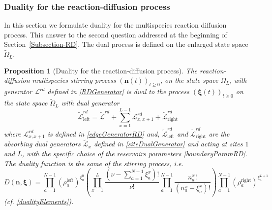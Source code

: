 \documentclass[10pt]{article}
\numberwithin{equation}{section}
\numberwithin{equation}{subsection}
\newtheorem{proposition}{Proposition}
\begin{document}
\subsubsection{Duality for the reaction-diffusion process}
In this section we formulate duality for the multispecies reaction diffusion process. This answer to the second question addressed at the beginning of Section~\ref{Subsection-RD}.  The dual process is defined on the enlarged state space $\widetilde{\Omega}_{L}$.  
\begin{proposition}[Duality for the reaction-diffusion process]\label{propositin-duality-RD}
The reaction-diffusion multispecies stirring process $(\bm{n}(t))_{t\geq 0}$, on the state space $\Omega_{L}$, with generator $\mathcal{L}^{rd}$ defined in \eqref{RDGenerator} is dual to the process $(\bm{\xi}(t))_{t\geq 0}$ on the state space $\widetilde{\Omega}_{L}$ with dual generator
\begin{equation}\label{DualGeneratorRD}
	\widetilde{\mathcal{L}}_{\text{left}}^{rd}=\widetilde{\mathcal{L}}^{rd}+\sum_{x=1}^{L-1}\mathcal{L}_{x,x+1}^{rd}+\widetilde{\mathcal{L}}_{\text{right}}^{rd}
\end{equation}
where 
$\mathcal{L}_{x,x+1}^{rd}$ is defined in \eqref{edgeGeneratorRD} and, $\widetilde{\mathcal{L}}_{\text{left}}^{rd}$ and $\widetilde{\mathcal{L}}_{\text{right}}^{rd}$ are the absorbing dual generators $\widetilde{\mathcal{L}}_{x}$ defined in \eqref{siteDualGenerator} and acting at sites $1$ and $L$, with the specific choice of the reservoirs parameters \eqref{boundaryParamRD}. The duality function
is the same of the stirring process, i.e.
\begin{equation}
	D(\bm{n},\bm{\xi})=\prod_{a=1}^{N-1}\left(\rho_{a}^{\text{left}}\right)^{\xi_{a}^{0}}\left(\prod_{x=1}^{L}\frac{(\nu -\sum_{a=1}^{N-1}\xi_{a}^{x})!}{\nu!}\prod_{a=1}^{N-1}\frac{n_{a}^{x}!}{(n_{a}^{x}-\xi_{a}^{x})!}\right)\prod_{a=1}^{N-1}\left(\rho_{a}^{\text{right}}\right)^{\xi_{a}^{L+1}}
\end{equation}
(cf. \eqref{dualityElements}).
\end{proposition} 
\end{document}
